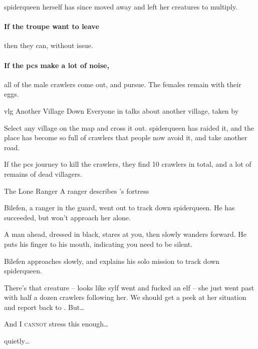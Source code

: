 

\Gls{spiderqueen} herself has since moved away and left her creatures to multiply.

\paragraph{If the troupe want to leave}
then they can, without issue.

\paragraph{If the \glspl{pc} make a lot of noise,}
all of the male \glspl{crawler} come out, and pursue.
The females remain with their eggs.

{\gls{vlg} Another Village Down}%
{Everyone in  talks about another village, taken by }%

Select any village on the map and cross it out.
\Gls{spiderqueen} has raided it, and the place has become so full of \glspl{crawler} that people now avoid it, and take another road.

If the \glspl{pc} journey to kill the \glspl{crawler}, they find 10 \glspl{crawler} in total, and a lot of remains of dead villagers.

{The Lone Ranger}%
{A  ranger describes 's fortress}%

Bilefen, a ranger in the \gls{guard}, went out to track down \gls{spiderqueen}.
He has succeeded, but won't approach her alone.

\begin{boxtext}
  A man ahead, dressed in black, stares at you, then slowly wanders forward.
  He puts his finger to his mouth, indicating you need to be silent.
\end{boxtext}

Bilefen approaches slowly, and explains his solo mission to track down \gls{spiderqueen}.

\begin{speechtext}
  \small
  There's that creature -- looks like \gls{sylf} went and fucked an elf -- she just went past with half a dozen \glspl{crawler} following her.
  We should get a peek at her situation and report back to .
  But\ldots

  And I {\large\scshape cannot} stress this enough\ldots

  \noindent
  quietly\ldots
\end{speechtext}

